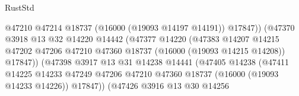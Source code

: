 \begin{lexlean}{RustStd}
\begin{coremodule}
                                                @47210
                                                @47214
                                                @18737
                                                (@16000 (@19093 @14197 @14191))
                                                @17847))
                                            (@47370
                                              @3918
                                              @13
                                              @32
                                              @14220
                                              @14442
                                              (@47377
                                                @14220
                                                (@47383
                                                  @14207
                                                  @14215
                                                  @47202
                                                  @47206
                                                  @47210
                                                  @47360
                                                  @18737
                                                  (@16000 (@19093 @14215 @14208))
                                                  @17847))
                                              (@47398
                                                @3917
                                                @13
                                                @31
                                                @14238
                                                @14441
                                                (@47405
                                                  @14238
                                                  (@47411
                                                    @14225
                                                    @14233
                                                    @47249
                                                    @47206
                                                    @47210
                                                    @47360
                                                    @18737
                                                    (@16000 (@19093 @14233 @14226))
                                                    @17847))
                                                (@47426
                                                  @3916
                                                  @13
                                                  @30
                                                  @14256

\end{coremodule}
\end{lexlean}
